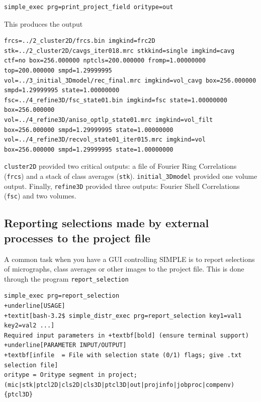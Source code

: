 \documentclass[a4paper,11pt]{article}
\newcommand{\prgname}[1]{\textcolor{NavyBlue}{\texttt{#1}}}
\begin{document}
\begin{Verbatim}[commandchars=+\[\],fontsize=\small,breaklines=true]
simple_exec prg=print_project_field oritype=out
\end{Verbatim}

\noindent{}This produces the output

\begin{Verbatim}[commandchars=+\[\],fontsize=\small,breaklines=true]
frcs=../2_cluster2D/frcs.bin imgkind=frc2D
stk=../2_cluster2D/cavgs_iter018.mrc stkkind=single imgkind=cavg ctf=no box=256.000000 nptcls=200.000000 fromp=1.00000000 top=200.000000 smpd=1.29999995
vol=../3_initial_3Dmodel/rec_final.mrc imgkind=vol_cavg box=256.000000 smpd=1.29999995 state=1.00000000
fsc=../4_refine3D/fsc_state01.bin imgkind=fsc state=1.00000000 box=256.000000
vol=../4_refine3D/aniso_optlp_state01.mrc imgkind=vol_filt box=256.000000 smpd=1.29999995 state=1.00000000
vol=../4_refine3D/recvol_state01_iter015.mrc imgkind=vol box=256.000000 smpd=1.29999995 state=1.00000000
\end{Verbatim}

\noindent{}\prgname{cluster2D} provided two critical outputs: a file of Fourier Ring Correlations (\texttt{frcs}) and a stack of class averages (\texttt{stk}). \prgname{initial\_3Dmodel} provided one volume output. Finally, \prgname{refine3D} provided three outputs: Fourier Shell Correlations (\texttt{fsc}) and two volumes.

\subsection{Reporting selections made by external processes to the project file}

A common task when you have a GUI controlling SIMPLE is to report selections of micrographs, class averages or other images to the project file. This is done through the program \texttt{report\_selection}
\begin{Verbatim}[commandchars=+\[\],fontsize=\small,breaklines=true]
simple_exec prg=report_selection
+underline[USAGE]
+textit[bash-3.2$ simple_distr_exec prg=report_selection key1=val1 key2=val2 ...]
Required input parameters in +textbf[bold] (ensure terminal support)
+underline[PARAMETER INPUT/OUTPUT]
+textbf[infile  = File with selection state (0/1) flags; give .txt selection file]
oritype = Oritype segment in project; (mic|stk|ptcl2D|cls2D|cls3D|ptcl3D|out|projinfo|jobproc|compenv){ptcl3D}
\end{Verbatim}
\end{document}
